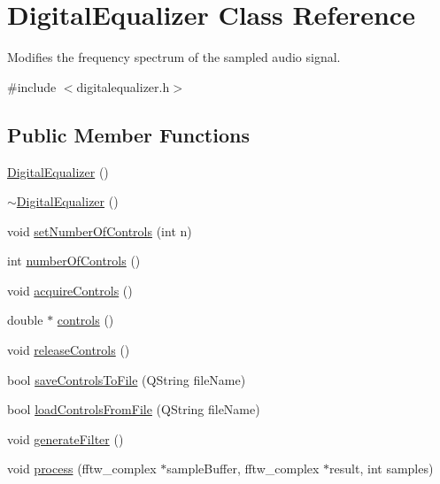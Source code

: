 \hypertarget{classDigitalEqualizer}{\section{\-Digital\-Equalizer \-Class \-Reference}
\label{de/d28/classDigitalEqualizer}
}


\-Modifies the frequency spectrum of the sampled audio signal.  




{\ttfamily \#include $<$digitalequalizer.\-h$>$}

\subsection*{\-Public \-Member \-Functions}
\begin{DoxyCompactItemize}
\item 
\hyperlink{classDigitalEqualizer_ae73196a702a995b74874c229f0ac11de}{\-Digital\-Equalizer} ()
\item 
\hyperlink{classDigitalEqualizer_a2b5c4ba64b279d781c76a05424f34ab8}{$\sim$\-Digital\-Equalizer} ()
\item 
void \hyperlink{classDigitalEqualizer_a1ef9715686cd404bfc0aa95958928be4}{set\-Number\-Of\-Controls} (int n)
\item 
int \hyperlink{classDigitalEqualizer_a18cb2658f2daba42520eff1afe6e67c3}{number\-Of\-Controls} ()
\item 
void \hyperlink{classDigitalEqualizer_a8dd84de986b4a50170f2a296342f55da}{acquire\-Controls} ()
\item 
double $\ast$ \hyperlink{classDigitalEqualizer_a1328730773d4415bf8ad010e0dce0ec1}{controls} ()
\item 
void \hyperlink{classDigitalEqualizer_a38314bc1535c71f2a20c179f98330d43}{release\-Controls} ()
\item 
bool \hyperlink{classDigitalEqualizer_a4b878ffb698ba3fea5b36e51328489eb}{save\-Controls\-To\-File} (\-Q\-String file\-Name)
\item 
bool \hyperlink{classDigitalEqualizer_a97abb9d7b75b6515f48ffcbc2d1591d1}{load\-Controls\-From\-File} (\-Q\-String file\-Name)
\item 
void \hyperlink{classDigitalEqualizer_aa4a96390ed7480d85fbe4fac36239ec2}{generate\-Filter} ()
\item 
void \hyperlink{classDigitalEqualizer_aa65783c000b904e1b937196f9b1f6f4a}{process} (fftw\-\_\-complex $\ast$sample\-Buffer, fftw\-\_\-complex $\ast$result, int samples)
\end{DoxyCompactItemize}


